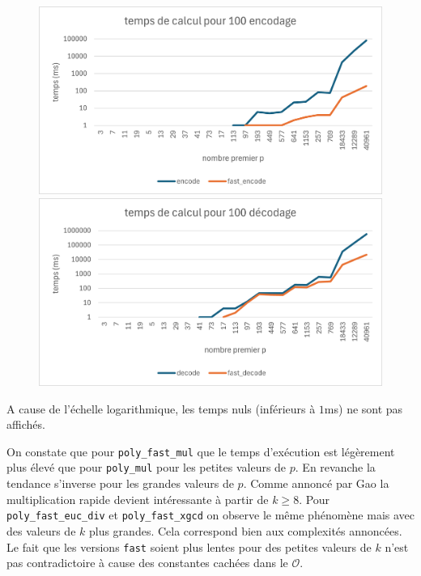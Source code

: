 \documentclass{article}
\theoremstyle{definition}
\theoremstyle{remark}
\begin{document}
\begin{figure}
    \centering
    \begin{minipage}{.5\textwidth}
        \includegraphics[width=\textwidth]{RS_enc.png}
    \end{minipage}%
    \begin{minipage}{.5\textwidth} 
        \includegraphics[width=\textwidth]{RS_dec.png}
    \end{minipage}
\end{figure}

\newpage

A cause de l'échelle logarithmique, les temps nuls (inférieurs à $1$ms) ne sont pas affichés.

On constate que pour \verb|poly_fast_mul| que le temps d'exécution est légèrement plus élevé que pour \verb|poly_mul| pour les petites valeurs de $p$. En revanche la tendance s'inverse pour les grandes valeurs de $p$. Comme annoncé par Gao la multiplication rapide devient intéressante à partir de $k \ge 8$. Pour \verb|poly_fast_euc_div| et \verb|poly_fast_xgcd| on observe le même phénomène mais avec des valeurs de $k$ plus grandes. Cela correspond bien aux complexités annoncées. Le fait que les versions \verb|fast| soient plus lentes pour des petites valeurs de $k$ n'est pas contradictoire à cause des constantes cachées dans le $\mathcal{O}$. 
\end{document}

